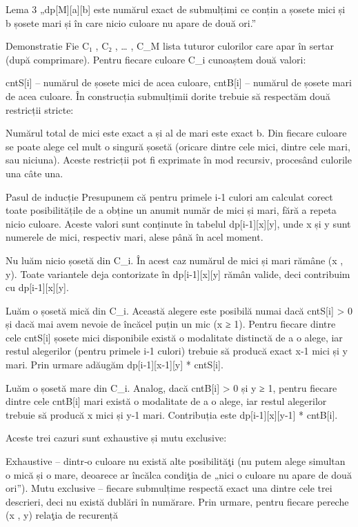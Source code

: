 Lema 3
„dp[M][a][b] este numărul exact de submulțimi ce conțin a șosete mici și b șosete mari și în care nicio culoare nu apare de două ori.”

Demonstratie
Fie C₁ , C₂ , … , C_M lista tuturor culorilor care apar în sertar (după comprimare).
Pentru fiecare culoare C_i cunoaștem două valori:

cntS[i] – numărul de șosete mici de acea culoare,
cntB[i] – numărul de șosete mari de acea culoare.
În construcția submulțimii dorite trebuie să respectăm două restricții stricte:

Numărul total de mici este exact a și al de mari este exact b.
Din fiecare culoare se poate alege cel mult o singură șosetă (oricare dintre cele mici, dintre cele mari, sau niciuna).
Aceste restricții pot fi exprimate în mod recursiv, procesând culorile una câte una.

Pasul de inducție
Presupunem că pentru primele i‑1 culori am calculat corect toate posibilitățile de a obține un anumit număr de mici și mari, fără a repeta nicio culoare. Aceste valori sunt conținute în tabelul dp[i‑1][x][y], unde x și y sunt numerele de mici, respectiv mari, alese până în acel moment.

Nu luăm nicio șosetă din C_i.
În acest caz numărul de mici și mari rămâne (x , y). Toate variantele deja contorizate în dp[i‑1][x][y] rămân valide, deci contribuim cu dp[i‑1][x][y].

Luăm o șosetă mică din C_i.
Această alegere este posibilă numai dacă cntS[i] > 0 și dacă mai avem nevoie de încăcel puțin un mic (x ≥ 1). Pentru fiecare dintre cele cntS[i] șosete mici disponibile există o modalitate distinctă de a o alege, iar restul alegerilor (pentru primele i‑1 culori) trebuie să producă exact x‑1 mici și y mari. Prin urmare adăugăm
dp[i‑1][x‑1][y] * cntS[i].

Luăm o șosetă mare din C_i.
Analog, dacă cntB[i] > 0 și y ≥ 1, pentru fiecare dintre cele cntB[i] mari există o modalitate de a o alege, iar restul alegerilor trebuie să producă x mici și y‑1 mari. Contribuția este
dp[i‑1][x][y‑1] * cntB[i].

Aceste trei cazuri sunt exhaustive și mutu exclusive:

Exhaustive – dintr‑o culoare nu există alte posibilităţi (nu putem alege simultan o mică și o mare, deoarece ar încălca condiţia de „nici o culoare nu apare de două ori”).
Mutu exclusive – fiecare submulțime respectă exact una dintre cele trei descrieri, deci nu există dublări în numărare.
Prin urmare, pentru fiecare pereche (x , y) relaţia de recurență

